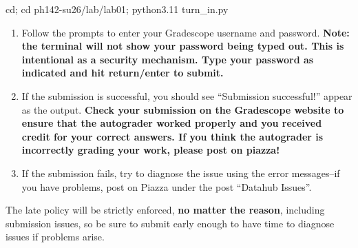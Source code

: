 \documentclass[
]{article}
\providecommand{\tightlist}{%
  \setlength{\itemsep}{0pt}\setlength{\parskip}{0pt}}
\begin{document}
cd; cd ph142-su26/lab/lab01; python3.11 turn\_in.py

\begin{enumerate}
\def\labelenumi{\arabic{enumi}.}
\setcounter{enumi}{2}
\tightlist
\item
  Follow the prompts to enter your Gradescope username and password.
  \textbf{Note: the terminal will not show your password being typed
  out. This is intentional as a security mechanism. Type your password
  as indicated and hit return/enter to submit.}
\item
  If the submission is successful, you should see ``Submission
  successful!'' appear as the output. \textbf{Check your submission on
  the Gradescope website to ensure that the autograder worked properly
  and you received credit for your correct answers. If you think the
  autograder is incorrectly grading your work, please post on piazza!}
\item
  If the submission fails, try to diagnose the issue using the error
  messages--if you have problems, post on Piazza under the post
  ``Datahub Issues''.
\end{enumerate}

The late policy will be strictly enforced, \textbf{no matter the
reason}, including submission issues, so be sure to submit early enough
to have time to diagnose issues if problems arise.
\end{document}
